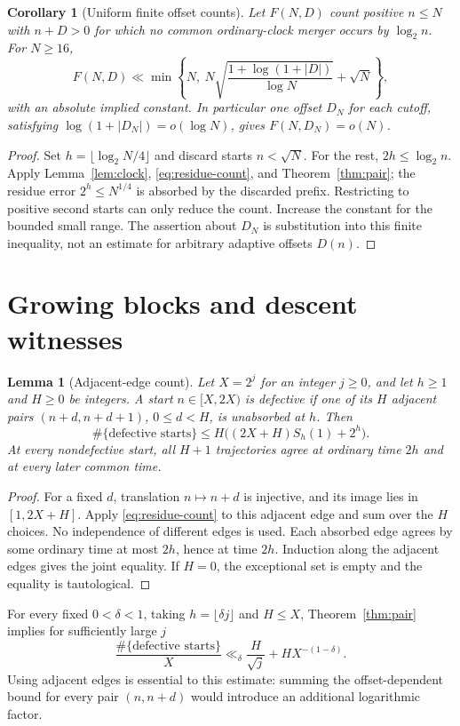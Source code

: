 \documentclass[11pt]{amsart}
\newtheorem{lemma}[theorem]{Lemma}
\newtheorem{corollary}[theorem]{Corollary}
\theoremstyle{definition}
\theoremstyle{remark}
\begin{document}
\begin{corollary}[Uniform finite offset counts]\label{cor:finite}
Let $F(N,D)$ count positive $n\le N$ with $n+D>0$ for which no common ordinary-clock merger occurs by $\log_2 n$. For $N\ge16$,
\[
 F(N,D)\ll\min\left\{N,\ N\sqrt{\frac{1+\log(1+|D|)}{\log N}}+\sqrt N\right\},
\]
with an absolute implied constant. In particular one offset $D_N$ for each cutoff, satisfying $\log(1+|D_N|)=o(\log N)$, gives $F(N,D_N)=o(N)$.
\end{corollary}
\begin{proof}
Set $h=\lfloor\log_2N/4\rfloor$ and discard starts $n<\sqrt N$. For the rest, $2h\le\log_2n$. Apply Lemma~\ref{lem:clock}, \eqref{eq:residue-count}, and Theorem~\ref{thm:pair}; the residue error $2^h\le N^{1/4}$ is absorbed by the discarded prefix. Restricting to positive second starts can only reduce the count. Increase the constant for the bounded small range. The assertion about $D_N$ is substitution into this finite inequality, not an estimate for arbitrary adaptive offsets $D(n)$.
\end{proof}

\section{Growing blocks and descent witnesses}\label{sec:windows}
\begin{lemma}[Adjacent-edge count]\label{lem:window-count}
Let $X=2^j$ for an integer $j\ge0$, and let $h\ge1$ and $H\ge0$ be integers. A start $n\in[X,2X)$ is defective if one of its $H$ adjacent pairs $(n+d,n+d+1)$, $0\le d<H$, is unabsorbed at $h$. Then
\[
 \#\{\text{defective starts}\}
 \le H\bigl((2X+H)S_h(1)+2^h\bigr).
\]
At every nondefective start, all $H+1$ trajectories agree at ordinary time $2h$ and at every later common time.
\end{lemma}
\begin{proof}
For a fixed $d$, translation $n\mapsto n+d$ is injective, and its image lies in $[1,2X+H]$. Apply \eqref{eq:residue-count} to this adjacent edge and sum over the $H$ choices. No independence of different edges is used. Each absorbed edge agrees by some ordinary time at most $2h$, hence at time $2h$. Induction along the adjacent edges gives the joint equality. If $H=0$, the exceptional set is empty and the equality is tautological.
\end{proof}
For every fixed $0<\delta<1$, taking $h=\lfloor\delta j\rfloor$ and $H\le X$, Theorem~\ref{thm:pair} implies for sufficiently large $j$
\begin{equation}\label{eq:shell}
 \frac{\#\{\text{defective starts}\}}{X}
 \ll_\delta \frac{H}{\sqrt j}+HX^{-(1-\delta)}.
\end{equation}
Using adjacent edges is essential to this estimate: summing the offset-dependent bound for every pair $(n,n+d)$ would introduce an additional logarithmic factor.
\end{document}

